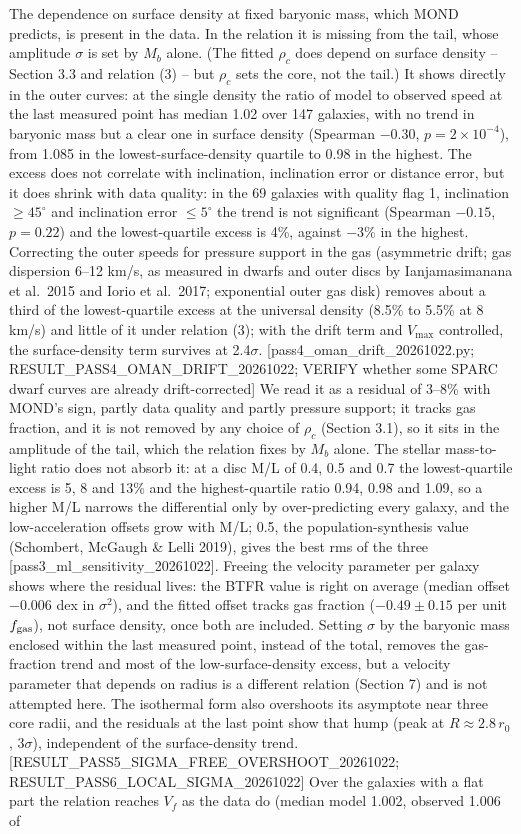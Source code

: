 \documentclass[
  10pt,
]{article}
\begin{document}
The dependence on surface density at fixed baryonic mass, which MOND predicts, is present in the data. In the relation it is missing from the tail, whose amplitude $\sigma$ is set by $M_b$ alone. (The fitted $\rho_c$ does depend on surface density -- Section 3.3 and relation (3) -- but $\rho_c$ sets the core, not the tail.) It shows directly in the outer curves: at the single density the ratio of model to observed speed at the last measured point has median 1.02 over 147 galaxies, with no trend in baryonic mass but a clear one in surface density (Spearman $-0.30$, $p=2\times10^{-4}$), from 1.085 in the lowest-surface-density quartile to 0.98 in the highest. The excess does not correlate with inclination, inclination error or distance error, but it does shrink with data quality: in the 69 galaxies with quality flag 1, inclination $\ge45^\circ$ and inclination error $\le5^\circ$ the trend is not significant (Spearman $-0.15$, $p=0.22$) and the lowest-quartile excess is 4\%, against $-3$\% in the highest. Correcting the outer speeds for pressure support in the gas (asymmetric drift; gas dispersion 6--12 km/s, as measured in dwarfs and outer discs by Ianjamasimanana et al.~2015 and Iorio et al.~2017; exponential outer gas disk) removes about a third of the lowest-quartile excess at the universal density (8.5\% to 5.5\% at 8 km/s) and little of it under relation (3); with the drift term and $V_{\max}$ controlled, the surface-density term survives at 2.4$\sigma$. {[}pass4\_oman\_drift\_20261022.py; RESULT\_PASS4\_OMAN\_DRIFT\_20261022; VERIFY whether some SPARC dwarf curves are already drift-corrected{]} We read it as a residual of 3--8\% with MOND's sign, partly data quality and partly pressure support; it tracks gas fraction, and it is not removed by any choice of $\rho_c$ (Section 3.1), so it sits in the amplitude of the tail, which the relation fixes by $M_b$ alone. The stellar mass-to-light ratio does not absorb it: at a disc M/L of 0.4, 0.5 and 0.7 the lowest-quartile excess is 5, 8 and 13\% and the highest-quartile ratio 0.94, 0.98 and 1.09, so a higher M/L narrows the differential only by over-predicting every galaxy, and the low-acceleration offsets grow with M/L; 0.5, the population-synthesis value (Schombert, McGaugh \& Lelli 2019), gives the best rms of the three {[}pass3\_ml\_sensitivity\_20261022{]}. Freeing the velocity parameter per galaxy shows where the residual lives: the BTFR value is right on average (median offset $-0.006$ dex in $\sigma^2$), and the fitted offset tracks gas fraction ($-0.49\pm0.15$ per unit $f_{\rm gas}$), not surface density, once both are included. Setting $\sigma$ by the baryonic mass enclosed within the last measured point, instead of the total, removes the gas-fraction trend and most of the low-surface-density excess, but a velocity parameter that depends on radius is a different relation (Section 7) and is not attempted here. The isothermal form also overshoots its asymptote near three core radii, and the residuals at the last point show that hump (peak at $R\approx2.8\,r_0$, $3\sigma$), independent of the surface-density trend. {[}RESULT\_PASS5\_SIGMA\_FREE\_OVERSHOOT\_20261022; RESULT\_PASS6\_LOCAL\_SIGMA\_20261022{]} Over the galaxies with a flat part the relation reaches $V_f$ as the data do (median model 1.002, observed 1.006 of 
\end{document}
